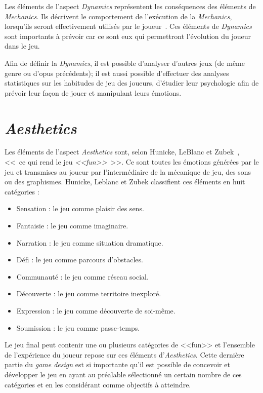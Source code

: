 Les \'el\'ements de l'aspect \emph{Dynamics} repr\'esentent les conséquences des \'el\'ements de \emph{Mechanics}. 
Ils décrivent le comportement de l'exécution de la \emph{Mechanics}, lorsqu'ils seront effectivement utilisés par le joueur~\cite{GAMA_MDA}. 
Ces \'el\'ements de \emph{Dynamics} sont importants à prévoir car ce sont eux qui permettront l'évolution du joueur dans le jeu.

Afin de définir la \emph{Dynamics}, il est possible d'analyser d'autres jeux (de même genre ou d'opus précédents); il est aussi possible d'effectuer des analyses statistiques sur les habitudes de jeu des joueurs, d'étudier leur psychologie afin de prévoir leur façon de jouer et manipulant leurs émotions.


\section{\emph{Aesthetics}}
Les \'el\'ements de l'aspect \emph{Aesthetics} sont, selon Hunicke, LeBlanc et Zubek~\cite{MDA_formal}, <<~ce qui rend le jeu \emph{<<fun>>}~>>. 
Ce sont toutes les émotions générées par le jeu et transmises au joueur par l'interm\'ediaire de la mécanique de jeu, des sons ou des graphismes. Hunicke, Leblanc et Zubek classifient ces \'el\'ements en huit catégories :
\begin{itemize}
    \item Sensation : le jeu comme plaisir des sens.
    \item Fantaisie : le jeu comme imaginaire.
    \item Narration : le jeu comme situation dramatique.
    \item D\'efi : le jeu comme parcours d'obstacles.
    \item Communauté : le jeu comme réseau social.
    \item Découverte : le jeu comme territoire inexploré.
    \item Expression : le jeu comme découverte de soi-même.
    \item Soumission : le jeu comme passe-temps.
\end{itemize}


Le jeu final peut contenir une ou plusieurs catégories de <<fun>> et l'ensemble de l'expérience du joueur repose sur ces \'el\'ements d'\emph{Aesthetics}. 
Cette dernière partie du \emph{game design} est si importante qu'il est possible de concevoir et développer le jeu en ayant au préalable sélectionné un certain nombre de ces catégories et en les considérant comme objectifs à atteindre.




